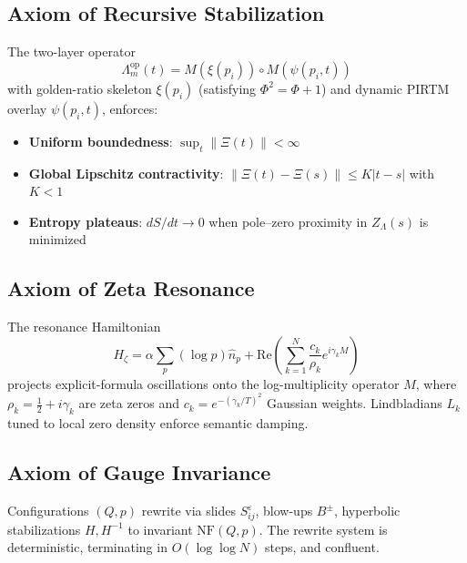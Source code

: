\documentclass[12pt]{amsart}
\theoremstyle{plain}
\begin{document}
\subsection{Axiom of Recursive Stabilization}

\begin{axiom}\label{ax:lambda}
The two-layer operator
\[
\Lambda_m^{\text{op}}(t) = M(\xi(p_i)) \circ M(\psi(p_i, t))
\]
with golden-ratio skeleton \(\xi(p_i)\) (satisfying \(\Phi^2 = \Phi + 1\)) and dynamic PIRTM overlay \(\psi(p_i,t)\), enforces:
\begin{itemize}[leftmargin=*]
\item \textbf{Uniform boundedness}: \(\sup_t \|\Xi(t)\| < \infty\)
\item \textbf{Global Lipschitz contractivity}: \(\|\Xi(t) - \Xi(s)\| \leq K|t-s|\) with \(K < 1\)
\item \textbf{Entropy plateaus}: \(dS/dt \to 0\) when pole--zero proximity in \(Z_\Lambda(s)\) is minimized
\end{itemize}
\end{axiom}

\subsection{Axiom of Zeta Resonance}

\begin{axiom}\label{ax:zeta}
The resonance Hamiltonian
\[
H_\zeta = \alpha \sum_p (\log p) \hat{n}_p + \text{Re}\left(\sum_{k=1}^N \frac{c_k}{\rho_k} e^{i\gamma_k M}\right)
\]
projects explicit-formula oscillations onto the log-multiplicity operator \(M\), where \(\rho_k = \tfrac{1}{2} + i\gamma_k\) are zeta zeros and \(c_k = e^{-(\gamma_k/T)^2}\) Gaussian weights. Lindbladians \(L_k\) tuned to local zero density enforce semantic damping.
\end{axiom}

\subsection{Axiom of Gauge Invariance}

\begin{axiom}\label{ax:nf}
Configurations \((Q, p)\) rewrite via slides \(S_{ij}^\varepsilon\), blow-ups \(B^\pm\), hyperbolic stabilizations \(H, H^{-1}\) to invariant \(\text{NF}(Q,p)\). The rewrite system is deterministic, terminating in \(O(\log \log N)\) steps, and confluent.
\end{axiom}
\end{document}
